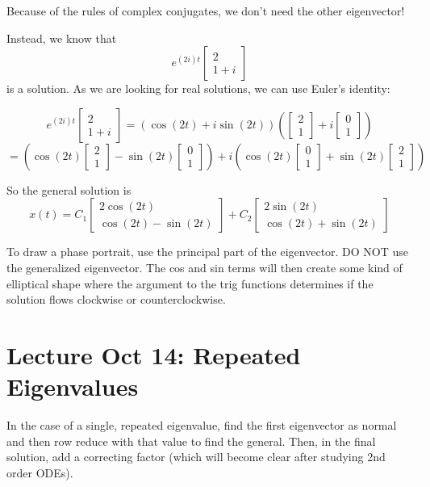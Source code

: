 \documentclass[12pt]{article}
\begin{document}
Because of the rules of complex conjugates, we don't need the other eigenvector!

Instead, we know that 
\[e^{(2i) t} \begin{bmatrix}
    2\\ 1 +i
\end{bmatrix}\]
is a solution. As we are looking for real solutions, we can use Euler's identity:

\[e^{(2i) t} \begin{bmatrix}
    2\\ 1 +i
\end{bmatrix} = \left(\cos(2t) + i \sin(2t)\right)\left(\begin{bmatrix}
    2\\1
\end{bmatrix} + i \begin{bmatrix}
    0\\1
\end{bmatrix}\right)\]
\[= \left(\cos(2t) \begin{bmatrix}
    2\\1
\end{bmatrix} - \sin(2t) \begin{bmatrix}
    0\\1
\end{bmatrix}\right) + i \left(\cos (2t) \begin{bmatrix}
    0\\1
\end{bmatrix} + \sin(2t) \begin{bmatrix}
    2\\1
\end{bmatrix}\right)\]

So the general solution is 
\[\boxed{x(t) = C_1 \begin{bmatrix}
    2\cos (2t)\\
    \cos(2t) - \sin (2t)
\end{bmatrix} + C_2 \begin{bmatrix}
    2 \sin (2t)\\
    \cos(2t) + \sin(2t)
\end{bmatrix}}\]

To draw a phase portrait, use the principal part of the eigenvector. DO NOT use the generalized eigenvector. The cos and sin terms will then create some kind of elliptical shape where the argument to the trig functions determines if the solution flows clockwise or counterclockwise. 

\section{Lecture Oct 14: Repeated Eigenvalues}
In the case of a single, repeated eigenvalue, find the first eigenvector as normal and then row reduce with that value to find the general. Then, in the final solution, add a correcting factor (which will become clear after studying 2nd order ODEs).
\end{document}

